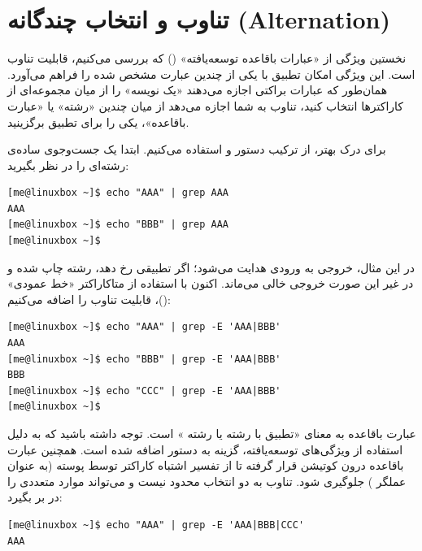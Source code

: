 \section{تناوب و انتخاب چندگانه (Alternation)}

نخستین ویژگی از «عبارات باقاعده توسعه‌یافته» () که بررسی می‌کنیم، قابلیت تناوب است. این ویژگی امکان تطبیق با یکی از چندین عبارت مشخص شده را فراهم می‌آورد. همان‌طور که عبارات براکتی اجازه می‌دهند «یک نویسه» را از میان مجموعه‌ای از کاراکترها انتخاب کنید، تناوب به شما اجازه می‌دهد از میان چندین «رشته» یا «عبارت باقاعده»، یکی را برای تطبیق برگزینید.

برای درک بهتر، از ترکیب دستور  و  استفاده می‌کنیم. ابتدا یک جست‌وجوی ساده‌ی رشته‌ای را در نظر بگیرید:

\begin{latin}
\begin{lstlisting}
[me@linuxbox ~]$ echo "AAA" | grep AAA
AAA
[me@linuxbox ~]$ echo "BBB" | grep AAA
[me@linuxbox ~]$
\end{lstlisting}
\end{latin}

در این مثال، خروجی  به ورودی  هدایت می‌شود؛ اگر تطبیقی رخ دهد، رشته چاپ شده و در غیر این صورت خروجی خالی می‌ماند. اکنون با استفاده از متاکاراکتر «خط عمودی» (\cmd{|})، قابلیت تناوب را اضافه می‌کنیم:

\begin{latin}
\begin{lstlisting}
[me@linuxbox ~]$ echo "AAA" | grep -E 'AAA|BBB'
AAA
[me@linuxbox ~]$ echo "BBB" | grep -E 'AAA|BBB'
BBB
[me@linuxbox ~]$ echo "CCC" | grep -E 'AAA|BBB'
[me@linuxbox ~]$
\end{lstlisting}
\end{latin}

عبارت باقاعده  به معنای «تطبیق با رشته  یا رشته » است. توجه داشته باشید که به دلیل استفاده از ویژگی‌های توسعه‌یافته، گزینه  به دستور  اضافه شده است. همچنین عبارت باقاعده درون کوتیشن قرار گرفته تا از تفسیر اشتباه کاراکتر \cmd{|} توسط پوسته (به عنوان عملگر ) جلوگیری شود. تناوب به دو انتخاب محدود نیست و می‌تواند موارد متعددی را در بر بگیرد:

\begin{latin}
\begin{lstlisting}
[me@linuxbox ~]$ echo "AAA" | grep -E 'AAA|BBB|CCC'
AAA
\end{lstlisting}
\end{latin}

